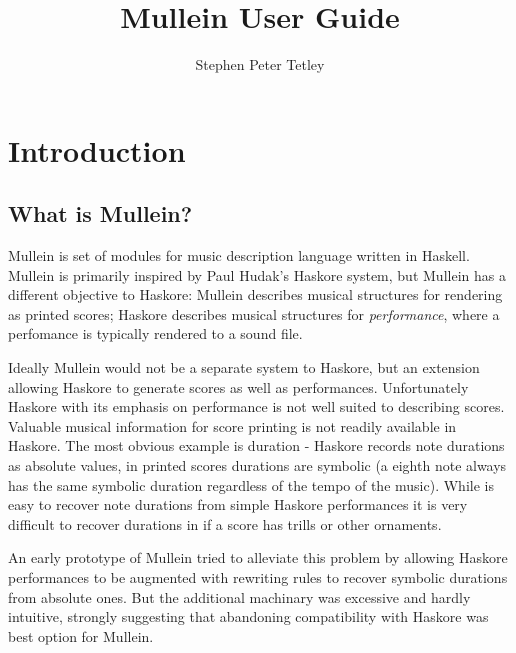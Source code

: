 \documentclass{article}
\begin{document}
\author{Stephen Peter Tetley}
\title{Mullein User Guide}
\maketitle
\tableofcontents

\section{Introduction}
\subsection{What is Mullein?}
Mullein is set of modules for music description language written 
in Haskell. Mullein is primarily inspired by Paul Hudak's 
Haskore system, but Mullein has a different objective to Haskore: 
Mullein describes musical structures for rendering as printed 
scores; Haskore describes musical structures for 
\emph{performance}, where a perfomance is typically rendered to 
a sound file. 

Ideally Mullein would not be a separate system to Haskore, but
an extension allowing Haskore to generate scores as well 
as performances. Unfortunately Haskore with its emphasis on 
performance is not well suited to describing scores. Valuable
musical information for score printing is not readily available
in Haskore. The most obvious example is duration - Haskore 
records note durations as absolute values, in printed scores 
durations are symbolic (a eighth note always has the same 
symbolic duration  regardless of the tempo 
of the music). While is easy to recover note durations from 
simple Haskore performances it is very difficult to recover 
durations in if a score has trills or other ornaments.

An early prototype of Mullein tried to alleviate this problem 
by allowing Haskore performances to be augmented with rewriting 
rules to recover symbolic durations from absolute ones. But the 
additional machinary was excessive and hardly intuitive, 
strongly suggesting that abandoning compatibility with Haskore
was best option for Mullein.

\begin{comment}

unit note length

pitch relative to scale 

Mullein represents durations symbolically... 
\begin{alltt} 
longa, breve, \nicefrac{1}{1}, \nicefrac{1}{2}, \nicefrac{1}{4},
\nicefrac{1}{8}, \nicefrac{1}{16}
\end{alltt}
\end{comment}
\end{document}
